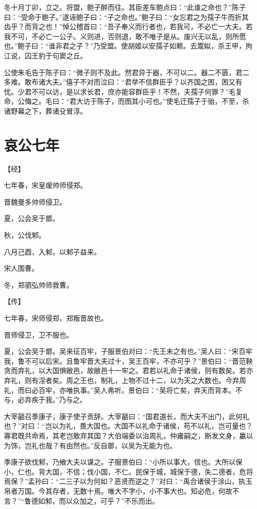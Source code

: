 \documentclass[a4paper,12pt,UTF8,twoside]{ctexbook}
\begin{document}
冬十月丁卯，立之。将盟，鲍子醉而往。其臣差车鲍点曰：“此谁之命也？”陈子曰：“受命于鲍子。”遂诬鲍子曰：“子之命也。”鲍子曰：“女忘君之为孺子牛而折其齿乎？而背之也！”悼公稽首曰：“吾子奉义而行者也，若我可，不必亡一大夫。若我不可，不必亡一公子。义则进，否则退，敢不唯子是从。废兴无以乱，则所愿也。”鲍子曰：“谁非君之子？”乃受盟。使胡姬以安孺子如赖。去鬻姒，杀王甲，拘江说，囚王豹于句窦之丘。

公使朱毛告于陈子曰：“微子则不及此。然君异于器，不可以二。器二不匮，君二多难。敢布诸大夫。”僖子不对而泣曰：“君举不信群臣乎？以齐国之困，困又有忧。少君不可以访，是以求长君，庶亦能容群臣乎！不然，夫孺子何罪？”毛复命，公悔之。毛曰：“君大访于陈子，而图其小可也。”使毛迁孺子于骀，不至，杀诸野幕之下，葬诸殳冒淳。


\section{哀公七年}



【经】

七年春，宋皇瑗帅师侵郑。

晋魏曼多帅师侵卫。

夏，公会吴于鄫。

秋，公伐邾。

八月己酉，入邾，以邾子益来。

宋人围曹。

冬，郑驷弘帅师救曹。

【传】

七年春，宋师侵郑，郑叛晋故也。

晋师侵卫，卫不服也。

夏，公会吴于鄫。吴来征百牢，子服景伯对曰：“先王未之有也。”吴人曰：“宋百牢我，鲁不可以后宋。且鲁牢晋大夫过十，吴王百牢，不亦可乎？”景伯曰：“晋范鞅贪而弃礼，以大国惧敝邑，故敝邑十一牢之。君若以礼命于诸侯，则有数矣。若亦弃礼，则有淫者矣。周之王也，制礼，上物不过十二，以为天之大数也。今弃周礼，而曰必百牢，亦唯执事。”吴人弗听。景伯曰：“吴将亡矣，弃天而背本。不与，必弃疾于我。”乃与之。

大宰嚭召季康子，康子使子贡辞。大宰嚭曰：“国君道长，而大夫不出门，此何礼也？”对曰：“岂以为礼，畏大国也。大国不以礼命于诸侯，苟不以礼，岂可量也？寡君既共命焉，其老岂敢弃其国？大伯端委以治周礼，仲雍嗣之，断发文身，臝以为饰，岂礼也哉？有由然也。”反自鄫，以吴为无能为也。

季康子欲伐邾，乃飨大夫以谋之。子服景伯曰：“小所以事大，信也。大所以保小，仁也。背大国，不信；伐小国，不仁。民保于城，城保于德，失二德者，危将焉保？”孟孙曰：“二三子以为何如？恶贤而逆之？”对曰：“禹合诸侯于涂山，执玉帛者万国。今其存者，无数十焉。唯大不字小，小不事大也。知必危，何故不言？”“鲁德如邾，而以众加之，可乎？”不乐而出。
\end{document}
